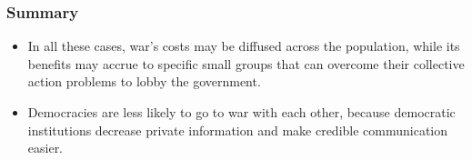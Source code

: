 \documentclass{beamer}
\begin{document}
\begin{frame} 
	\frametitle{\LARGE{Summary}}
	\begin{itemize} 
		\item In all these cases, war's costs may be diffused across the population, while its benefits may accrue to specific small groups that can overcome their collective action problems to lobby the government.
		\item Democracies are less likely to go to war with each other, because democratic institutions decrease private information and make credible communication easier.
	\end{itemize}
\end{frame}
\end{document}
